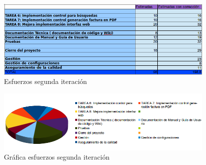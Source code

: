 \begin{figure}[h!]
\centering
\includegraphics[width=0.95\textwidth]{img/6143}
\caption{Esfuerzos segunda iteración}
 \label{fig:6143}
\end{figure}

\begin{figure}[h!]
\centering
\includegraphics[width=0.95\textwidth]{img/6144}
\caption{Gráfica esfuerzos segunda iteración}
 \label{fig:6144}
\end{figure}